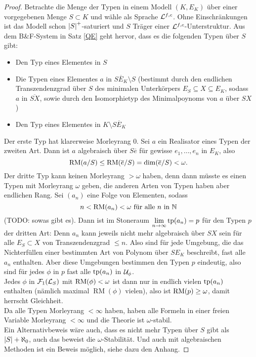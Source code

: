     \begin{proof}
    	Betrachte die Menge der Typen in einem Modell $(K,E_K)$ über einer vorgegebenen Menge $S\subset K$ und wähle als Sprache $\mathcal{L}^{f,c}$. Ohne Einschränkungen ist das Modell schon ${\left| S \right|}^+$-saturiert und $S$ Träger einer $\mathcal{L}^{f,c}$-Unterstruktur. Aus dem B\&F-System in Satz \ref{QE} geht hervor, dass es die folgenden Typen über $S$ gibt:
    	\begin{itemize}
    		\item Den Typ eines Elementes in $S$
    		\item Die Typen eines Elementes $a$ in $\overline{SE_K}\setminus S$ (bestimmt durch den endlichen Trans\-zen\-denz\-grad über $S$ des minimalen Unterkörpers $E_S\subseteq X\subseteq E_K$, sodass $a$ in $\overline{SX}$, sowie durch den Isomorphietyp des Minimalpoynoms von $a$ über $SX$)
    		\item Den Typ eines Elementes in $K\setminus\overline{SE_K}$
    	\end{itemize}
        Der erste Typ hat klarerweise Morleyrang 0. Sei $a$ ein Realisator eines Typen der zweiten Art. Dann ist $a$ algebraisch über $S\overline{e}$ für gewisse $e_1,\dots,e_n$ in $E_K$, also $$\operatorname{RM}(a/S)\leq\operatorname{RM}(\overline{e}/S)=\dim(\overline{e}/S)<\omega.$$
        Der dritte Typ kann keinen Morleyrang $>\omega$ haben, denn dann müsste es einen Typen mit Morleyrang $\omega$ geben, die anderen Arten von Typen haben aber endlichen Rang. Sei $(a_n)$ eine Folge von Elementen, sodass $$n<\operatorname{RM}(a_n)<\omega\text{ für alle }n\text{ in }\mathbb{N}$$ (TODO: sowas gibt es). Dann ist im Stoneraum $\lim\limits_{n\rightarrow\infty}\operatorname{tp}(a_n)=p$ für den Typen $p$ der dritten Art: Denn $a_n$ kann jeweils nicht mehr algebraisch über $SX$ sein für alle $E_S\subset X$ von Transzendenzgrad $\leq n$. Also sind für jede Umgebung, die das Nichterfüllen einer bestimmten Art von Polynom über $SE_K$ beschreibt, fast alle $a_n$ enthalten. Aber diese Umgebungen bestimmen den Typen $p$ eindeutig, also sind für jedes $\phi$ in $p$ fast alle $\operatorname{tp}(a_n)$ in $\mathcal{U}_\phi$.\\
        Jedes $\phi$ in $\mathcal{F}_1(\mathcal{L}_S)$ mit $\operatorname{RM}(\phi)<\omega$ ist dann nur in endlich vielen $\operatorname{tp}(a_n)$ enthalten (nämlich maximal $\operatorname{RM}(\phi)$ vielen), also ist $\operatorname{RM}(p)\geq\omega$, damit herrscht Gleichheit.\\
        Da alle Typen Morleyrang $<\infty$ haben, haben alle Formeln in einer freien Variable Morleyrang $<\infty$ und die Theorie ist $\omega$-stabil.\\
        Ein Alternativbeweis wäre auch, dass es nicht mehr Typen über $S$ gibt als ${\left| S \right|}+\aleph_0$, auch das beweist die $\omega$-Stabilität. Und auch mit algebraischen Methoden ist ein Beweis möglich, siehe dazu den Anhang.
    \end{proof}